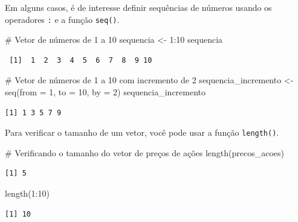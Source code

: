 \documentclass[
  letterpaper,
  DIV=11,
  numbers=noendperiod]{scrreprt}
\newenvironment{Shaded}{\begin{snugshade}}{\end{snugshade}}
\newcommand{\AttributeTok}[1]{\textcolor[rgb]{0.40,0.45,0.13}{#1}}
\newcommand{\CommentTok}[1]{\textcolor[rgb]{0.37,0.37,0.37}{#1}}
\newcommand{\DecValTok}[1]{\textcolor[rgb]{0.68,0.00,0.00}{#1}}
\newcommand{\FunctionTok}[1]{\textcolor[rgb]{0.28,0.35,0.67}{#1}}
\newcommand{\NormalTok}[1]{\textcolor[rgb]{0.00,0.23,0.31}{#1}}
\newcommand{\OtherTok}[1]{\textcolor[rgb]{0.00,0.23,0.31}{#1}}
\newcommand{\SpecialCharTok}[1]{\textcolor[rgb]{0.37,0.37,0.37}{#1}}
\begin{document}
Em alguns casos, é de interesse definir sequências de números usando os
operadores \texttt{:} e a função \texttt{seq()}.

\begin{Shaded}
\begin{Highlighting}[]
\CommentTok{\# Vetor de números de 1 a 10}
\NormalTok{sequencia }\OtherTok{\textless{}{-}} \DecValTok{1}\SpecialCharTok{:}\DecValTok{10}
\NormalTok{sequencia}
\end{Highlighting}
\end{Shaded}

\begin{verbatim}
 [1]  1  2  3  4  5  6  7  8  9 10
\end{verbatim}

\begin{Shaded}
\begin{Highlighting}[]
\CommentTok{\# Vetor de números de 1 a 10 com incremento de 2}
\NormalTok{sequencia\_incremento }\OtherTok{\textless{}{-}} \FunctionTok{seq}\NormalTok{(}\AttributeTok{from =} \DecValTok{1}\NormalTok{, }\AttributeTok{to =} \DecValTok{10}\NormalTok{, }\AttributeTok{by =} \DecValTok{2}\NormalTok{)}
\NormalTok{sequencia\_incremento}
\end{Highlighting}
\end{Shaded}

\begin{verbatim}
[1] 1 3 5 7 9
\end{verbatim}

Para verificar o tamanho de um vetor, você pode usar a função
\texttt{length()}.

\begin{Shaded}
\begin{Highlighting}[]
\CommentTok{\# Verificando o tamanho do vetor de preços de ações}
\FunctionTok{length}\NormalTok{(precos\_acoes)}
\end{Highlighting}
\end{Shaded}

\begin{verbatim}
[1] 5
\end{verbatim}

\begin{Shaded}
\begin{Highlighting}[]
\FunctionTok{length}\NormalTok{(}\DecValTok{1}\SpecialCharTok{:}\DecValTok{10}\NormalTok{)}
\end{Highlighting}
\end{Shaded}

\begin{verbatim}
[1] 10
\end{verbatim}
\end{document}
